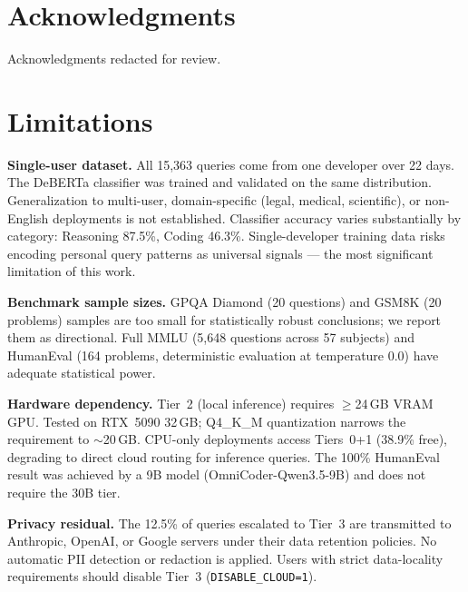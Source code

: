 \documentclass[11pt]{article}
\begin{document}
\section*{Acknowledgments}

Acknowledgments redacted for review.




\section*{Limitations}
\label{sec:limitations}

\textbf{Single-user dataset.} All 15,363 queries come from one developer
over 22 days. The DeBERTa classifier was trained and validated on the
same distribution. Generalization to multi-user, domain-specific
(legal, medical, scientific), or non-English deployments is not
established. Classifier accuracy varies substantially by category:
Reasoning 87.5\%, Coding 46.3\%. Single-developer training data risks
encoding personal query patterns as universal signals --- the most
significant limitation of this work.

\textbf{Benchmark sample sizes.} GPQA Diamond (20 questions) and GSM8K
(20 problems) samples are too small for statistically robust conclusions;
we report them as directional. Full MMLU (5,648 questions across 57
subjects) and HumanEval (164 problems, deterministic evaluation at
temperature 0.0) have adequate statistical power.

\textbf{Hardware dependency.} Tier~2 (local inference) requires
$\geq$24\,GB VRAM GPU. Tested on RTX~5090 32\,GB; Q4\_K\_M
quantization narrows the requirement to $\sim$20\,GB. CPU-only
deployments access Tiers~0+1 (38.9\% free), degrading to direct cloud
routing for inference queries. The 100\% HumanEval result was achieved
by a 9B model (OmniCoder-Qwen3.5-9B) and does not require the 30B tier.

\textbf{Privacy residual.} The 12.5\% of queries escalated to Tier~3
are transmitted to Anthropic, OpenAI, or Google servers under their
data retention policies. No automatic PII detection or redaction is
applied. Users with strict data-locality requirements should disable
Tier~3 (\texttt{DISABLE\_CLOUD=1}).
\end{document}

